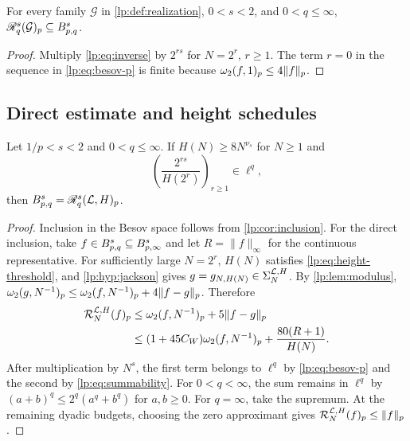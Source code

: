 \documentclass[11pt,a4paper]{article}
\begin{document}
\begin{corolario}
\label{lp:cor:inclusion}
For every family $\mathcal G$ in \cref{lp:def:realization}, $0<s<2$, and $0<q\le\infty$,
$\mathscr R^{s}_{q}(\mathcal G)_p\subseteq B^{s}_{p,q}$.
\end{corolario}

\begin{proof}
Multiply \eqref{lp:eq:inverse} by $2^{rs}$ for $N=2^r$, $r\ge1$. The term $r=0$ in the sequence in \eqref{lp:eq:besov-p} is finite because $\omega_2(f,1)_{p}\le4\|f\|_p$.
\end{proof}

\subsection{Direct estimate and height schedules}

\begin{proposicao}
\label{lp:thm:besov-conditional}
Let $1/p<s<2$ and $0<q\le\infty$. If $H(N)\ge8N^{\nu_s}$ for $N\ge1$ and
\begin{equation}
 \left(\frac{2^{rs}}{H(2^r)}\right)_{r\ge1}\in\ell^q,
 \label{lp:eq:summability}
\end{equation}
then $B^{s}_{p,q}=\mathscr R^{s}_{q}(\mathcal L,H)_p$.
\end{proposicao}

\begin{proof}
Inclusion in the Besov space follows from \cref{lp:cor:inclusion}. For the direct inclusion, take $f\in B^{s}_{p,q}\subseteq B^{s}_{p,\infty}$ and let $R=\|f\|_\infty$ for the continuous representative. For sufficiently large $N=2^r$, $H(N)$ satisfies \eqref{lp:eq:height-threshold}, and \cref{lp:hyp:jackson} gives $g=g_{N,H(N)}\in\Sigma_{N}^{\mathcal L,H}$. By \cref{lp:lem:modulus},
$\omega_2(g,N^{-1})_{p}\le\omega_2(f,N^{-1})_{p}+4\|f-g\|_p$. Therefore
\begin{align}
 \mathcal R^{\mathcal L,H}_{N}(f)_p
 &\le \omega_2(f,N^{-1})_{p}+5\|f-g\|_p\notag\\
 &\le (1+45 C_W)\omega_2(f,N^{-1})_{p}+\frac{80(R+1)}{H(N)}.
 \label{lp:eq:direct-bound}
\end{align}
After multiplication by $N^s$, the first term belongs to $\ell^q$ by \eqref{lp:eq:besov-p} and the second by \eqref{lp:eq:summability}. For $0<q<\infty$, the sum remains in $\ell^q$ by $(a+b)^q\le2^q(a^q+b^q)$ for $a,b\ge0$. For $q=\infty$, take the supremum. At the remaining dyadic budgets, choosing the zero approximant gives $\mathcal R^{\mathcal L,H}_{N}(f)_p\le\|f\|_p$.
\end{proof}
\end{document}
